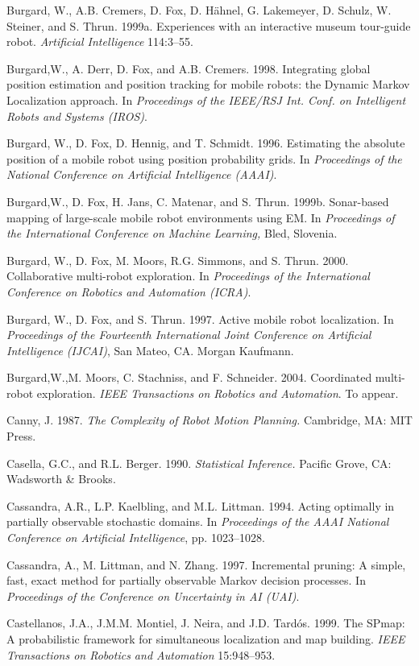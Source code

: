 \documentclass[10pt,a4paper]{article}
\begin{document}
Burgard, W., A.B. Cremers, D. Fox, D. Hähnel, G. Lakemeyer, D. Schulz, W. Steiner,
and S. Thrun. 1999a. Experiences with an interactive museum tour-guide robot.
\textit{Artificial Intelligence} 114:3–55.

Burgard,W., A. Derr, D. Fox, and A.B. Cremers. 1998. Integrating global position estimation
and position tracking for mobile robots: the Dynamic Markov Localization
approach. In \textit{Proceedings of the IEEE/RSJ Int. Conf. on Intelligent Robots and Systems
(IROS)}.

Burgard, W., D. Fox, D. Hennig, and T. Schmidt. 1996. Estimating the absolute position
of a mobile robot using position probability grids. In \textit{Proceedings of the National
Conference on Artificial Intelligence (AAAI)}.

Burgard,W., D. Fox, H. Jans, C. Matenar, and S. Thrun. 1999b. Sonar-based mapping
of large-scale mobile robot environments using EM. In \textit{Proceedings of the International
Conference on Machine Learning,} Bled, Slovenia.

Burgard, W., D. Fox, M. Moors, R.G. Simmons, and S. Thrun. 2000. Collaborative
multi-robot exploration. In \textit{Proceedings of the International Conference on Robotics and
Automation (ICRA)}.

Burgard, W., D. Fox, and S. Thrun. 1997. Active mobile robot localization. In \textit{Proceedings
of the Fourteenth International Joint Conference on Artificial Intelligence (IJCAI)},
San Mateo, CA. Morgan Kaufmann.

Burgard,W.,M. Moors, C. Stachniss, and F. Schneider. 2004. Coordinated multi-robot
exploration. \textit{IEEE Transactions on Robotics and Automation}. To appear.

Canny, J. 1987. \textit{The Complexity of Robot Motion Planning.} Cambridge, MA: MIT Press.

Casella, G.C., and R.L. Berger. 1990. \textit{Statistical Inference.} Pacific Grove, CA:
Wadsworth \& Brooks.

Cassandra, A.R., L.P. Kaelbling, and M.L. Littman. 1994. Acting optimally in partially
observable stochastic domains. In \textit{Proceedings of the AAAI National Conference on
Artificial Intelligence}, pp. 1023–1028.

Cassandra, A., M. Littman, and N. Zhang. 1997. Incremental pruning: A simple, fast,
exact method for partially observable Markov decision processes. In \textit{Proceedings of
the Conference on Uncertainty in AI (UAI)}.

Castellanos, J.A., J.M.M. Montiel, J. Neira, and J.D. Tardós. 1999. The SPmap: A
probabilistic framework for simultaneous localization and map building. \textit{IEEE
Transactions on Robotics and Automation} 15:948–953.
\end{document}
